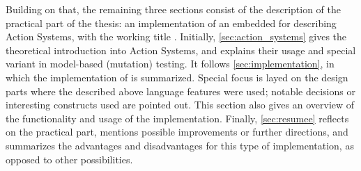 Building on that, the remaining three sections consist of the description of the practical part of
the thesis: an implementation of an embedded \dsl{} for describing Action Systems, with the working
title \actium. Initially, \autoref{sec:action_systems} gives the theoretical introduction into
Action Systems, and explains their usage and special variant in model-based (mutation) testing. It
follows \autoref{sec:implementation}, in which the implementation of \actium{} is
summarized. Special focus is layed on the design parts where the described above language features
were used; notable decisions or interesting constructs used are pointed out. This section also gives
an overview of the functionality and usage of the implementation. Finally, \autoref{sec:resumee}
reflects on the practical part, mentions possible improvements or further directions, and summarizes
the advantages and disadvantages for this type of implementation, as opposed to other possibilities.



